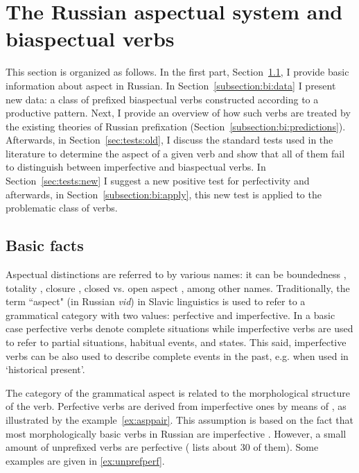 \section{The Russian aspectual system and biaspectual verbs}\label{section:new:biaspectual}
This section is organized as follows. In the first part, Section~\ref{subsection:basic}, I provide basic information about aspect in Russian.  In Section~\ref{subsection:bi:data} I present new data: a class of prefixed biaspectual verbs constructed according to a productive pattern. Next, I provide an overview of how such verbs are treated by the existing theories of Russian prefixation (Section~\ref{subsection:bi:predictions}). Afterwards, in Section~\ref{sec:tests:old}, I discuss the standard tests used in the literature to determine the aspect of a given verb and show that all of them fail to distinguish between imperfective and biaspectual verbs. In Section~\ref{sec:tests:new} I suggest a new positive test for perfectivity and afterwards, in Section~\ref{subsection:bi:apply}, this new test is applied to the problematic class of verbs.

\subsection{Basic facts}\label{subsection:basic}
Aspectual distinctions  are referred to by various names: it can be boundedness \citep{Avilova:76, Jakobson:57, Paducheva:96, Talmy:00}, totality \citep{Forsyth:70, Bondarko:71, Comrie:76, Dickey:00, Maslov:65}, closure \citep{Timberlake:82}, closed vs. open aspect \citep{Janda:07a}, among other names. Traditionally, the term ``aspect" (in Russian \textit{vid}) in Slavic linguistics is used to refer to a grammatical category with two values: perfective and imperfective. In a basic case perfective verbs denote complete situations while imperfective verbs are used to refer to partial situations, habitual events, and states. This said, imperfective verbs can be also used to describe complete events in the past, e.g. when used in `historical present'. 

The category of the grammatical aspect is related to the morphological structure of the verb. Perfective verbs are derived from imperfective ones by means of , as illustrated by the example~\ref{ex:asppair}. This assumption is based on the fact that most morphologically basic verbs in Russian are imperfective \citep[see, e.g.,][]{Isachenko:60, Forsyth:70}. However, a small amount of unprefixed verbs are perfective (\citealt{Isachenko:60} lists about 30 of them). Some examples are given in \ref{ex:unprefperf}.

